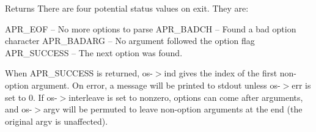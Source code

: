 \begin{DoxyReturn}{Returns}
There are four potential status values on exit. They are\+: 
\begin{DoxyPre}
            APR\_EOF      --  No more options to parse
            APR\_BADCH    --  Found a bad option character
            APR\_BADARG   --  No argument followed the option flag
            APR\_SUCCESS  --  The next option was found.
\end{DoxyPre}
 When A\+P\+R\+\_\+\+S\+U\+C\+C\+E\+SS is returned, os-\/$>$ind gives the index of the first non-\/option argument. On error, a message will be printed to stdout unless os-\/$>$err is set to 0. If os-\/$>$interleave is set to nonzero, options can come after arguments, and os-\/$>$argv will be permuted to leave non-\/option arguments at the end (the original argv is unaffected). 
\end{DoxyReturn}
